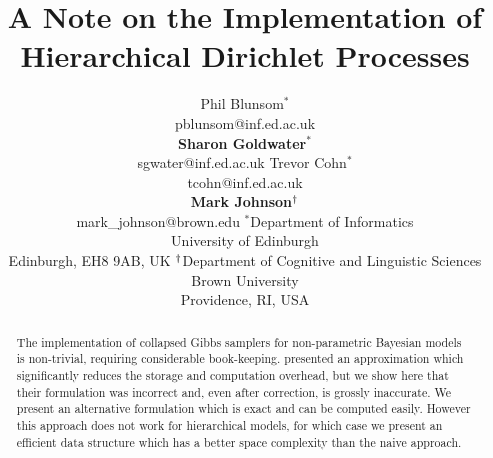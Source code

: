 \documentclass[11pt]{article}
\title{A Note on the Implementation of \\ Hierarchical Dirichlet Processes}
\author{
  Phil Blunsom$^*$\\\vspace{6pt} pblunsom@inf.ed.ac.uk\\
  {\bf Sharon Goldwater$^*$}\\ sgwater@inf.ed.ac.uk
 \And
  Trevor Cohn$^*$\\\vspace{6pt} tcohn@inf.ed.ac.uk\\
  {\bf Mark Johnson$^\textrm{\textdagger}$}\\ mark\_johnson@brown.edu
 \AND
  {\rm $^*$Department of Informatics}\\
  University of Edinburgh\\
  Edinburgh, EH8 9AB, UK \And
  {\rm $^\textrm{\textdagger}$Department of Cognitive and Linguistic Sciences}\\
  Brown University \\
  Providence, RI, USA
}
\date{}
\begin{document}
\maketitle

\setlength{\abovedisplayskip}{1ex}
\setlength{\belowdisplayskip}{1ex}

\begin{abstract}
The implementation of collapsed Gibbs samplers for non-parametric Bayesian models is non-trivial, requiring considerable book-keeping.
 presented an approximation which significantly reduces the storage and computation overhead, but we show here that their formulation was incorrect and, even after correction, is grossly inaccurate. 
We present an alternative formulation which is exact and can be computed easily. 
However this approach does not work for hierarchical models, for which case we present an efficient data structure which has a better space complexity than the naive approach.  
\end{abstract}
\end{document}
